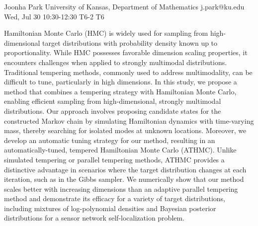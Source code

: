 \begin{talk}
  {Joonha Park}%
  {University of Kansas, Department of Mathematics}%
  {j.park@ku.edu}%
  {}%
  {}%
  {}%
  {Wed, Jul 30 10:30-12:30}%
  {T6-2}%
  {T6}%
  {}%
  
				

Hamiltonian Monte Carlo (HMC) is widely used for sampling from high-dimensional target distributions with probability density known up to proportionality. While HMC possesses favorable dimension scaling properties, it encounters challenges when applied to strongly multimodal distributions. Traditional tempering methods, commonly used to address multimodality, can be diﬃcult to tune, particularly in high dimensions. In this study, we propose a method that combines a tempering strategy with Hamiltonian Monte Carlo, enabling eﬃcient sampling from high-dimensional, strongly multimodal distributions. Our approach involves proposing candidate states for the constructed Markov chain by simulating Hamiltonian dynamics with time-varying mass, thereby searching for isolated modes at unknown locations. Moreover, we develop an automatic tuning strategy for our method, resulting in an automatically-tuned, tempered Hamiltonian Monte Carlo (ATHMC). Unlike simulated tempering or parallel tempering methods, ATHMC provides a distinctive advantage in scenarios where the target distribution changes at each iteration, such as in the Gibbs sampler. We numerically show that our method scales better with increasing dimensions than an adaptive parallel tempering method and demonstrate its eﬃcacy for a variety of target distributions, including mixtures of log-polynomial densities and Bayesian posterior distributions for a sensor network self-localization problem.
			
\end{talk}

